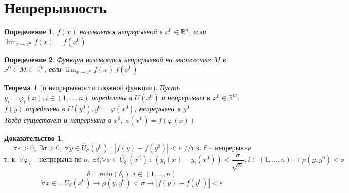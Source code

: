 \documentclass[a4paper, 12pt, titlepage, fleqn]{article}
\newtheorem{Def}{Определение}[section]
\newtheorem{Th}{Теорема}[section]
\newtheorem{Proof}{Доказательство}[section]
\newcommand{\Real}{\mathbb{R}}
\newcommand{\T}{\textbf}
\begin{document}
	\section{Непрерывность}
		\begin{Def}
			$f(x)$ называется непрерывной в $x^0 \in \Real^n$, если $\lim_{x\to x^0} f(x) = f(x^0)$
		\end{Def}
		\begin{Def}
			Функция называется непрерывной на множестве $M$ в $x^0 \in M \subset \Real^n$, если $\lim_{x\to x^0} f(x) \ f(x^0)$
		\end{Def}
		\begin{Th}[о непрерывности сложной функции]
			Пусть $y_i = \varphi_i(x), i \in (1, \dots, n)$ определены в $U(x^0)$ и непрерывны в $x^0 \in \Real^m$. $f(y)$ определена в $U(y^0), y^0 = \varphi(x^0)$, непрерывна в $y^0$\\
			Тогда существует и непрерывна в $x^0, \: \phi(x^0) = f(\varphi(x))$
		\end{Th}
		\begin{Proof}
			
			\[
				\forall \varepsilon > 0, \: \exists \sigma > 0, \: \forall y \in \dot{U_\sigma}(y^0) \:\colon\: |f(y) - f(y^0)| < \varepsilon \T{ //т.к. f -- непрерывна}
			\]
			\[
				\T{т. к. } \forall \varphi_i \T{ -- непрерына по } \sigma, \: \exists \delta_i \forall x \in \dot{U_{\delta_i}}(x^0) \: \colon \: (y_i(x) - y_i(x^0)) < \frac{\sigma}{\sqrt{n}}, i \in (1, \dots, n) \to \rho(y, y^0) < \sigma 
			\]
			\[
				\delta = min(\delta_i), i \in (1, \dots, n)
			\]
			\[
				\forall x \in \dots{U_\delta}(x^0) \to \rho(y, y^0) < \sigma \to |f(y) - f(y^0)| < \varepsilon
			\]
		\end{Proof}
\end{document}
